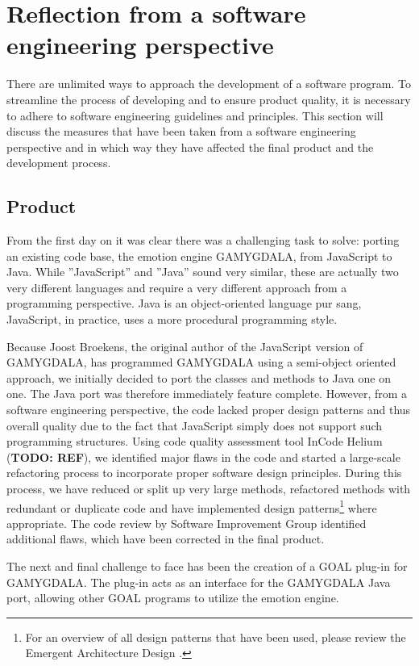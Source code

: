 \section{Reflection from a software engineering perspective}
There are unlimited ways to approach the development of a software program. To streamline the process of developing and to ensure product quality, it is necessary to adhere to software engineering guidelines and principles. This section will discuss the measures that have been taken from a software engineering perspective and in which way they have affected the final product and the development process.


\subsection{Product}
From the first day on it was clear there was a challenging task to solve: porting an existing code base, the emotion engine GAMYGDALA, from JavaScript to Java. While ''JavaScript'' and ''Java'' sound very similar, these are actually two very different languages and require a very different approach from a programming perspective. Java is an object-oriented language pur sang, JavaScript, in practice, uses a more procedural programming style.

Because Joost Broekens, the original author of the JavaScript version of GAMYGDALA, has programmed GAMYGDALA using a semi-object oriented approach, we initially decided to port the classes and methods to Java one on one. The Java port was therefore immediately feature complete. However, from a software engineering perspective, the code lacked proper design patterns and thus overall quality due to the fact that JavaScript simply does not support such  programming structures. Using code quality assessment tool InCode Helium (\textbf{TODO: REF}), we identified major flaws in the code and started a large-scale refactoring process to incorporate proper software design principles. During this process, we have reduced or split up very large methods, refactored methods with redundant or duplicate code and have implemented design patterns\footnote{For an overview of all design patterns that have been used, please review the Emergent Architecture Design \citep{ead}.} where appropriate. The code review by Software Improvement Group identified additional flaws, which have been corrected in the final product.

The next and final challenge to face has been the creation of a GOAL \citep{goal} plug-in for GAMYGDALA. The plug-in acts as an interface for the GAMYGDALA Java port, allowing other GOAL programs to utilize the emotion engine.

